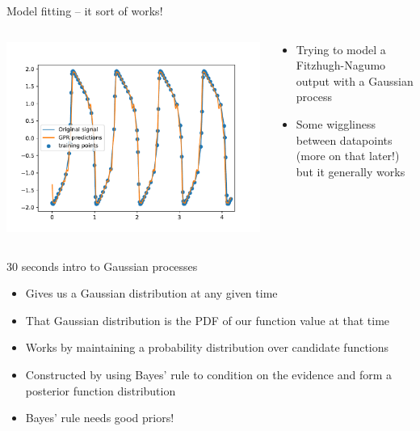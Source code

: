 \documentclass[presentation]{beamer}
\begin{document}
\begin{frame}[label={sec:org92d6518}]{Model fitting -- it sort of works!}
\begin{columns}
\begin{column}{0.6\columnwidth}
\begin{center}
\includegraphics[height=.85\textheight]{./gpr1.pdf}
\end{center}
\end{column}

\begin{column}{0.4\columnwidth}
\begin{itemize}
\item Trying to model a Fitzhugh-Nagumo output with a Gaussian process
\item Some wiggliness between datapoints (more on that later!) but it generally works
\end{itemize}
\end{column}
\end{columns}
\end{frame}

\begin{frame}[label={sec:org64da275}]{30 seconds intro to Gaussian processes}
\begin{itemize}
\item Gives us a Gaussian distribution at any given time
\item That Gaussian distribution is the PDF of our function value at that time
\item Works by maintaining a probability distribution over candidate functions
\item Constructed by using Bayes' rule to condition on the evidence and form a posterior function distribution
\item Bayes' rule needs good priors!
\end{itemize}
\end{frame}
\end{document}
